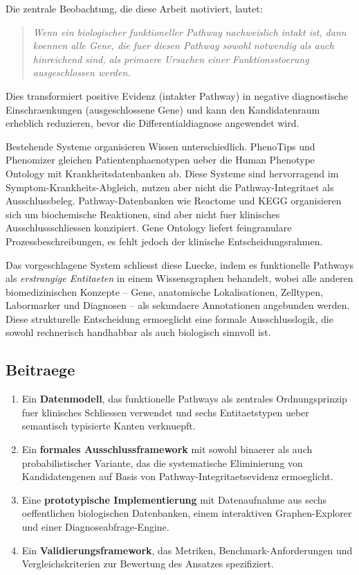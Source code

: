 \documentclass[12pt,a4paper]{article}
\begin{document}
Die zentrale Beobachtung, die diese Arbeit motiviert, lautet:

\begin{quote}
\emph{Wenn ein biologischer funktioneller Pathway nachweislich intakt ist, dann koennen alle Gene, die fuer diesen Pathway sowohl notwendig als auch hinreichend sind, als primaere Ursachen einer Funktionsstoerung ausgeschlossen werden.}
\end{quote}

Dies transformiert positive Evidenz (intakter Pathway) in negative diagnostische Einschraenkungen (ausgeschlossene Gene) und kann den Kandidatenraum erheblich reduzieren, bevor die Differentialdiagnose angewendet wird.

Bestehende Systeme organisieren Wissen unterschiedlich. PhenoTips \citep{Girdea2013} und Phenomizer \citep{Kohler2009} gleichen Patientenphaenotypen ueber die Human Phenotype Ontology \citep{Robinson2008} mit Krankheitsdatenbanken ab. Diese Systeme sind hervorragend im Symptom-Krankheits-Abgleich, nutzen aber nicht die Pathway-Integritaet als Ausschlussbeleg. Pathway-Datenbanken wie Reactome \citep{Fabregat2018} und KEGG organisieren sich um biochemische Reaktionen, sind aber nicht fuer klinisches Ausschlussschliessen konzipiert. Gene Ontology \citep{Ashburner2000} liefert feingranulare Prozessbeschreibungen, es fehlt jedoch der klinische Entscheidungsrahmen.

Das vorgeschlagene System schliesst diese Luecke, indem es funktionelle Pathways als \emph{erstrangige Entitaeten} in einem Wissensgraphen behandelt, wobei alle anderen biomedizinischen Konzepte -- Gene, anatomische Lokalisationen, Zelltypen, Labormarker und Diagnosen -- als sekundaere Annotationen angebunden werden. Diese strukturelle Entscheidung ermoeglicht eine formale Ausschlusslogik, die sowohl rechnerisch handhabbar als auch biologisch sinnvoll ist.

\subsection*{Beitraege}

\begin{enumerate}
    \item Ein \textbf{Datenmodell}, das funktionelle Pathways als zentrales Ordnungsprinzip fuer klinisches Schliessen verwendet und sechs Entitaetstypen ueber semantisch typisierte Kanten verknuepft.
    \item Ein \textbf{formales Ausschlussframework} mit sowohl binaerer als auch probabilistischer Variante, das die systematische Eliminierung von Kandidatengenen auf Basis von Pathway-Integritaetsevidenz ermoeglicht.
    \item Eine \textbf{prototypische Implementierung} mit Datenaufnahme aus sechs oeffentlichen biologischen Datenbanken, einem interaktiven Graphen-Explorer und einer Diagnoseabfrage-Engine.
    \item Ein \textbf{Validierungsframework}, das Metriken, Benchmark-Anforderungen und Vergleichskriterien zur Bewertung des Ansatzes spezifiziert.
\end{enumerate}
\end{document}
